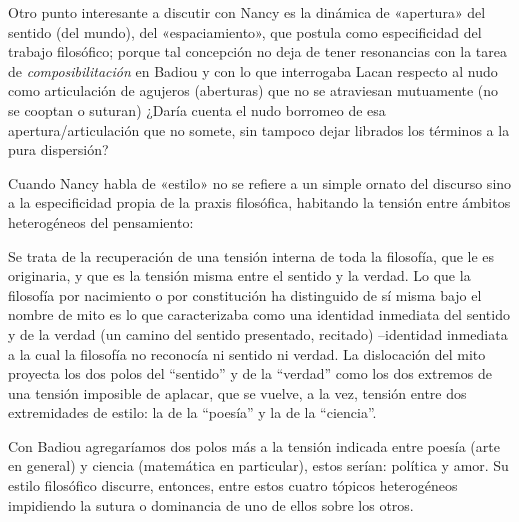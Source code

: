 Otro punto interesante a discutir con Nancy es la dinámica de «apertura» del sentido (del mundo), del «espaciamiento», que postula como especificidad del trabajo filosófico; porque tal concepción no deja de tener resonancias con la tarea de \emph{composibilitación} en Badiou y con lo que interrogaba Lacan respecto al nudo como articulación de agujeros (aberturas) que no se atraviesan mutuamente (no se cooptan o suturan) ¿Daría cuenta el nudo borromeo de esa apertura/articulación que no somete, sin tampoco dejar librados los términos a la pura dispersión?

Cuando Nancy habla de «estilo» no se refiere a un simple ornato del discurso sino a la especificidad propia de la praxis filosófica, habitando la tensión entre ámbitos heterogéneos del pensamiento:

Se trata de la recuperación de una tensión interna de toda la filosofía, que le es originaria, y que es la tensión misma entre el sentido y la verdad. Lo que la filosofía por nacimiento o por constitución ha distinguido de sí misma bajo el nombre de mito es lo que caracterizaba como una identidad inmediata del sentido y de la verdad (un camino del sentido presentado, recitado) --identidad inmediata a la cual la filosofía no reconocía ni sentido ni verdad. La dislocación del mito proyecta los dos polos del ``sentido'' y de la ``verdad'' como los dos extremos de una tensión imposible de aplacar, que se vuelve, a la vez, tensión entre dos extremidades de estilo: la de la ``poesía'' y la de la ``ciencia''.

Con Badiou agregaríamos dos polos más a la tensión indicada entre poesía (arte en general) y ciencia (matemática en particular), estos serían: política y amor. Su estilo filosófico discurre, entonces, entre estos cuatro tópicos heterogéneos impidiendo la sutura o dominancia de uno de ellos sobre los otros.

